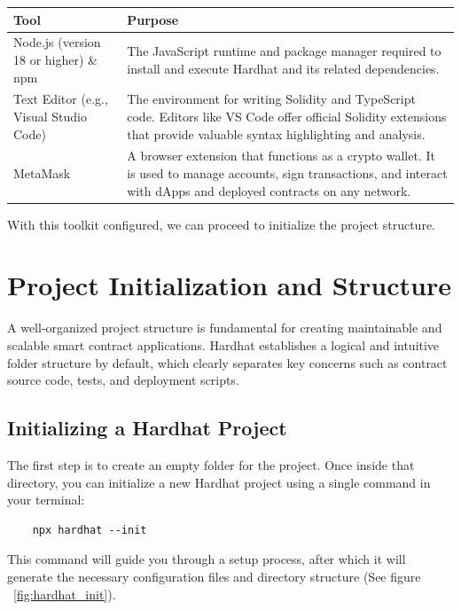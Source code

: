 \documentclass{scrbook}
\begin{document}
\begin{tabularx}{\linewidth}{|>{\raggedright\arraybackslash}X|>{\raggedright\arraybackslash}X|}
    \hline
    \textbf{Tool} & \textbf{Purpose} \\
    
    \hline
    Node.js (version 18 or higher) \& npm & The JavaScript runtime and package manager required to install and execute Hardhat and its related dependencies. \\
    
    \hline
    Text Editor (e.g., Visual Studio Code) & The environment for writing Solidity and TypeScript code. Editors like VS Code offer official Solidity extensions that provide valuable syntax highlighting and analysis. \\
    
    \hline
    MetaMask & A browser extension that functions as a crypto wallet. It is used to manage accounts, sign transactions, and interact with dApps and deployed contracts on any network. \\
    \hline
\end{tabularx}
\vspace{1em}

With this toolkit configured, we can proceed to initialize the project structure.

\chapter{Project Initialization and Structure}

A well-organized project structure is fundamental for creating maintainable and scalable smart contract applications. Hardhat establishes a logical and intuitive folder structure by default, which clearly separates key concerns such as contract source code, tests, and deployment scripts.

\section{Initializing a Hardhat Project}

The first step is to create an empty folder for the project. Once inside that directory, you can initialize a new Hardhat project using a single command in your terminal:

\begin{lstlisting}
    npx hardhat --init
\end{lstlisting}

This command will guide you through a setup process, after which it will generate the necessary configuration files and directory structure (See figure ~\ref{fig:hardhat_init}).\\
\end{document}
